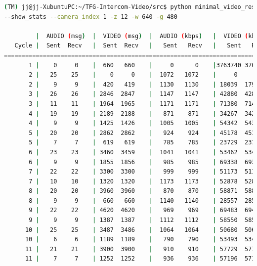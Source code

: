 \begin{lstlisting}[language=bash,basicstyle=\ttfamily\scriptsize]
(TM) jj@jj-XubuntuPC:~/TFG-Intercom-Video/src$ python minimal_video_resolution.py --show_video
--show_stats --camera_index 1 -z 12 -w 640 -g 480

         |  AUDIO (msg)  |  VIDEO (msg)  |  AUDIO (kbps)   |  VIDEO (kbps)   |     CPU (%) 
   Cycle |  Sent  Recv   |  Sent  Recv   |   Sent   Recv   |   Sent   Recv   | Program System
================================================================================================
       1 |    0     0    |  660   660    |     0      0    |3763740 3763740    |   0    100       
       2 |   25    25    |    0     0    |  1072   1072    |     0      0    |  23     73       
       2 |    9     9    |  420   419    |  1130   1130    | 18039  17996    |  46     74       
       3 |   26    26    | 2846  2847    |  1147   1147    | 42880  42895    |  53     73       
       3 |   11    11    | 1964  1965    |  1171   1171    | 71380  71417    |  55     72       
       4 |   19    19    | 2189  2188    |   871    871    | 34267  34251    |  37     76       
       4 |    9     9    | 1425  1426    |  1005   1005    | 54342  54381    |  44     78       
       5 |   20    20    | 2862  2862    |   924    924    | 45178  45178    |  43     76       
       5 |    7     7    |  619   619    |   785    785    | 23729  23729    |  41     76       
       6 |   23    23    | 3460  3459    |  1041   1041    | 53462  53447    |  52     75       
       6 |    9     9    | 1855  1856    |   985    985    | 69338  69375    |  83     74       
       7 |   22    22    | 3300  3300    |   999    999    | 51173  51173    |  66     75       
       7 |   10    10    | 1320  1320    |  1173   1173    | 52878  52878    |  50     76       
       8 |   20    20    | 3960  3960    |   870    870    | 58871  58871    |  55     74       
       8 |    9     9    |  660   660    |  1140   1140    | 28557  28557    |  50     75       
       9 |   22    22    | 4620  4620    |   969    969    | 69483  69483    |  57     74       
       9 |    9     9    | 1387  1387    |  1112   1112    | 58550  58550    |  41     72       
      10 |   25    25    | 3487  3486    |  1064   1064    | 50680  50665    |  36     72       
      10 |    6     6    | 1189  1189    |   790    790    | 53493  53493    |  48     71       
      11 |   21    21    | 3900  3900    |   910    910    | 57729  57729    |  46     72       
      11 |    7     7    | 1252  1252    |   936    936    | 57196  57196    |  40     74       

\end{lstlisting}
